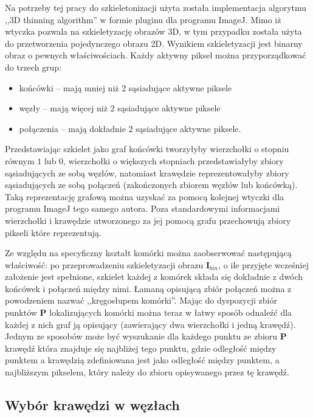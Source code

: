 \documentclass[declaration,shortabstract,mgr]{iithesis}
\newcommand{\image}{\mathbf{I}}
\begin{document}
Na potrzeby tej pracy do szkieletonizacji użyta została implementacja algorytmu ,,3D thinning algorithm''\cite{algo:3d-thinning} w formie pluginu dla programu ImageJ\cite{plugin:skeletonize-3d}. Mimo iż wtyczka pozwala na szkieletyzację obrazów 3D, w tym przypadku została użyta do przetworzenia pojedynczego obrazu 2D. Wynikiem szkieletyzacji jest binarny obraz o pewnych właściwościach. Każdy aktywny piksel można przyporządkować do trzech grup:
\begin{itemize}
  \item końcówki -- mają mniej niż 2 sąsiadujące aktywne piksele
  \item węzły -- mają więcej niż 2 sąsiadujące aktywne piksele
  \item połączenia -- mają dokładnie 2 sąsiadujące aktywne piksele.
\end{itemize}
Przedstawiając szkielet jako graf końcówki tworzyłyby wierzchołki o stopniu równym $1$ lub $0$, wierzchołki o większych stopniach przedstawiałyby zbiory sąsiadujących ze sobą węzłów, natomiast krawędzie reprezentowałyby zbiory sąsiadujących ze sobą połączeń (zakończonych zbiorem węzłów lub końcówką). Taką reprezentację grafową można uzyskać za pomocą kolejnej wtyczki dla programu ImageJ tego samego autora\cite{plugin:analyze-skeleton}. Poza standardowymi informacjami wierzchołki i krawędzie utworzonego za jej pomocą grafu przechowują zbiory pikseli które reprezentują.

Ze względu na specyficzny kształt komórki można zaobserwować następującą właściwość: po przeprowadzeniu szkieletyzacji obrazu $\image_{bin}$, o ile przyjęte wcześniej założenie jest spełnione, szkielet każdej z komórek składa się dokładnie z dwóch końcówek i połączeń między nimi. Łamaną opisującą zbiór połączeń można z powodzeniem nazwać ,,kręgosłupem komórki''. Mając do dyspozycji zbiór punktów $\mathbf{P}$ lokalizujących komórki można teraz w łatwy sposób odnaleźć dla każdej z nich graf ją opisujący (zawierający dwa wierzchołki i jedną krawędź). Jednym ze sposobów może być wyszukanie dla każdego punktu ze zbioru $\mathbf{P}$ krawędź która znajduje się najbliżej tego punktu, gdzie odległość między punktem a krawędzią zdefiniowana jest jako odległość między punktem, a najbliższym pikselem, który należy do zbioru opisywanego przez tę krawędź.

\subsection{Wybór krawędzi w węzłach}
\end{document}
